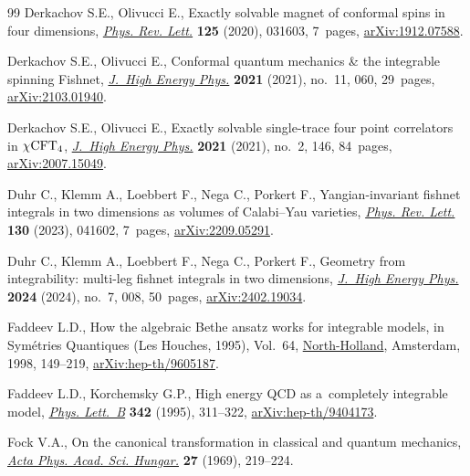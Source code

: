 \documentclass[pdftex]{sigma}
\numberwithin{equation}{section}
\begin{document}
\begin{thebibliography}{99}
Derkachov S.E., Olivucci E., Exactly solvable magnet of conformal spins in four
 dimensions,
 \href{https://doi.org/10.1103/physrevlett.125.031603}{\textit{Phys. Rev.
 Lett.}} \textbf{125} (2020), 031603, 7~pages,
 \href{http://arxiv.org/abs/1912.07588}{arXiv:1912.07588}.

Derkachov S.E., Olivucci E., Conformal quantum mechanics \& the integrable
 spinning {F}ishnet,
 \href{https://doi.org/10.1007/jhep11(2021)060}{\textit{J.~High Energy Phys.}}
 \textbf{2021} (2021), no.~11, 060, 29~pages,
 \href{http://arxiv.org/abs/2103.01940}{arXiv:2103.01940}.

Derkachov S.E., Olivucci E., Exactly solvable single-trace four point
 correlators in {$\chi {\rm CFT}_4$},
 \href{https://doi.org/10.1007/jhep02(2021)146}{\textit{J.~High Energy Phys.}}
 \textbf{2021} (2021), no.~2, 146, 84~pages,
 \href{http://arxiv.org/abs/2007.15049}{arXiv:2007.15049}.

Duhr C., Klemm A., Loebbert F., Nega C., Porkert F., Yangian-invariant fishnet
 integrals in two dimensions as volumes of {C}alabi--{Y}au varieties,
 \href{https://doi.org/10.1103/physrevlett.130.041602}{\textit{Phys. Rev.
 Lett.}} \textbf{130} (2023), 041602, 7~pages,
 \href{http://arxiv.org/abs/2209.05291}{arXiv:2209.05291}.

Duhr C., Klemm A., Loebbert F., Nega C., Porkert F., Geometry from
 integrability: multi-leg fishnet integrals in two dimensions,
 \href{https://doi.org/10.1007/jhep07(2024)008}{\textit{J.~High Energy Phys.}}
 \textbf{2024} (2024), no.~7, 008, 50~pages,
 \href{http://arxiv.org/abs/2402.19034}{arXiv:2402.19034}.

Faddeev L.D., How the algebraic {B}ethe ansatz works for integrable models, in
 Sym\'etries Quantiques ({L}es {H}ouches, 1995), Vol.~64,
 \href{https://doi.org/10.1007/jhep07(2024)008}{North-Holland}, Amsterdam,
 1998, 149--219,
 \href{http://arxiv.org/abs/hep-th/9605187}{arXiv:hep-th/9605187}.

Faddeev L.D., Korchemsky G.P., High energy {QCD} as a~completely integrable
 model, \href{https://doi.org/10.1016/0370-2693(94)01363-H}{\textit{Phys.
 Lett.~B}} \textbf{342} (1995), 311--322,
 \href{http://arxiv.org/abs/hep-th/9404173}{arXiv:hep-th/9404173}.

Fock V.A., On the canonical transformation in classical and quantum mechanics,
 \href{https://doi.org/10.1007/BF03156744}{\textit{Acta Phys. Acad. Sci.
 Hungar.}} \textbf{27} (1969), 219--224.


\end{thebibliography}
\end{document}
